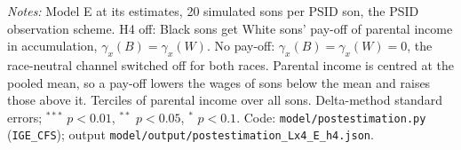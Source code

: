 \begin{table}[!htbp]
{\begin{tabular}{lcccccc}
\bottomrule
\end{tabular}}
\par\smallskip
\begin{minipage}{\textwidth}\footnotesize \textit{Notes:} Model E at its estimates, 20 simulated sons per PSID son, the PSID observation scheme. H4 off: Black sons get White sons' pay-off of parental income in accumulation, $\gamma_x(B) = \gamma_x(W)$. No pay-off: $\gamma_x(B) = \gamma_x(W) = 0$, the race-neutral channel switched off for both races. Parental income is centred at the pooled mean, so a pay-off lowers the wages of sons below the mean and raises those above it. Terciles of parental income over all sons. Delta-method standard errors; $^{***}$ $p<0.01$, $^{**}$ $p<0.05$, $^{*}$ $p<0.1$. Code: \texttt{model/postestimation.py} (\texttt{IGE\_CFS}); output \texttt{model/output/postestimation\_Lx4\_E\_h4.json}.\end{minipage}
\end{table}
